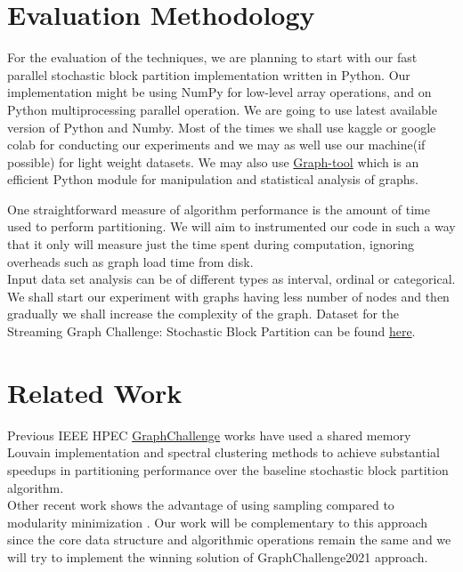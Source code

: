 \documentclass[conference]{IEEEtran}
\begin{document}
	\section{Evaluation Methodology}

	For the evaluation of the techniques, we are planning to start with our fast parallel stochastic block partition implementation written in Python. Our implementation might be using NumPy\cite{b9} for low-level array operations, and on Python multiprocessing parallel operation. We are going to use latest available version of Python and Numby. Most of the times we shall use kaggle or google colab for conducting our experiments and we may as well use our machine(if possible) for light weight datasets. We may also use \href{https://graph-tool.skewed.de/}{Graph-tool} which is an efficient Python module for manipulation and statistical analysis of graphs.

	One straightforward measure of algorithm performance
is the amount of time used to perform partitioning. We will aim to
instrumented our code in such a way that it only will measure just the time spent during computation, ignoring overheads such as graph load time from disk.\\

	Input data set analysis can be of different types as interval, ordinal or categorical. We shall start our experiment with graphs having less number of nodes and then gradually we shall increase the complexity of the graph. Dataset for the Streaming Graph Challenge: Stochastic Block Partition can be found \href{https://graphchallenge.mit.edu/data-sets#PartitionDatasets}{here}.\\

	\section{Related Work}
	Previous IEEE HPEC \href{https://graphchallenge.mit.edu/}{GraphChallenge} works have used
a shared memory Louvain implementation and spectral
clustering methods to achieve substantial speedups in partitioning performance over the baseline stochastic block
partition algorithm.\\
	Other recent work shows the advantage of using
	sampling compared to modularity minimization \cite{b10}. Our work
	will be complementary to this approach since the core data structure
	and algorithmic operations remain the same and we will try to implement the winning solution of GraphChallenge2021 approach.\\
\end{document}
